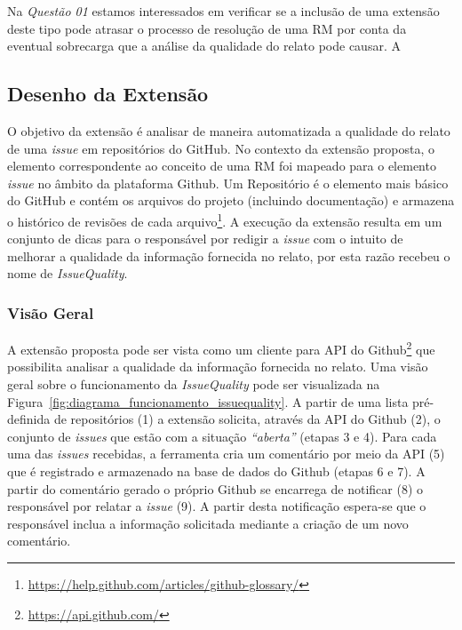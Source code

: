 Na \textit{Questão 01} estamos interessados em verificar se a inclusão de uma
extensão deste tipo pode atrasar o processo de resolução de uma RM por conta da
eventual sobrecarga que a análise da qualidade do relato pode causar. A

\subsection{Desenho da Extensão}
\label{sub:desenho_da_extensao}

O objetivo da extensão é analisar de maneira automatizada a qualidade do relato
de uma \textit{issue} em repositórios do GitHub. No contexto da extensão
proposta, o elemento correspondente ao conceito de uma RM foi mapeado para o
elemento \textit{issue} no âmbito da plataforma Github. Um Repositório é o
elemento mais básico do GitHub e contém os arquivos do projeto (incluindo
documentação) e armazena o histórico de revisões de cada
arquivo\footnote{\url{https://help.github.com/articles/github-glossary/}}. A
execução da extensão resulta em um conjunto de dicas para o responsável por
redigir a \textit{issue} com o intuito de melhorar a qualidade da informação
fornecida no relato, por esta razão recebeu o nome de \textit{IssueQuality}.

\subsubsection{Visão Geral}
\label{ssub:implementacao_extensao_visao_geral}

A extensão proposta pode ser vista como um cliente para API do
Github\footnote{\url{https://api.github.com/}} que possibilita analisar a
qualidade da informação fornecida no relato. Uma visão geral sobre o
funcionamento da \textit{IssueQuality} pode ser visualizada na
Figura~\ref{fig:diagrama_funcionamento_issuequality}. A partir de uma lista
pré-definida de repositórios (1) a extensão solicita, através da API do Github
(2), o conjunto de \textit{issues} que estão com a situação \textit{``aberta''}
(etapas 3 e 4). Para cada uma das \textit{issues} recebidas, a ferramenta cria
um comentário por meio da API (5) que é registrado e armazenado na base de dados
do Github (etapas 6 e 7). A partir do comentário gerado o próprio Github se
encarrega de notificar (8) o responsável por relatar a \textit{issue} (9). A
partir desta notificação espera-se que o responsável inclua a informação
solicitada mediante a criação de um novo comentário.

